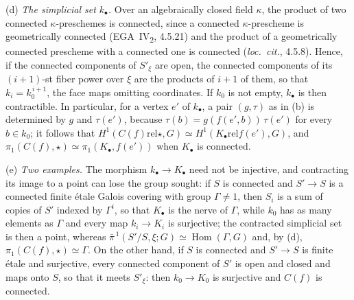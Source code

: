 \par\smallskip\noindent{}(d)
\emph{The simplicial set \(k_\bullet\).}
Over an algebraically closed field
\(\kappa\), the product of two connected \(\kappa\)-preschemes is
connected, since a connected \(\kappa\)-prescheme is geometrically
connected (EGA~IV\textsubscript{2}, 4.5.21) and the product of a
geometrically connected prescheme with a connected one is connected
(\emph{loc.\ cit.}, 4.5.8). Hence, if the connected components of
\(S'_\xi\) are open, the connected components of its \((i+1)\)-st fiber
power over \(\xi\) are the products of \(i+1\) of them, so that
\(k_i=k_0^{\,i+1}\), the face maps omitting coordinates. If \(k_0\) is
not empty, \(k_\bullet\) is then contractible. In particular, for a vertex
\(e'\) of \(k_\bullet\), a pair \((g,\tau)\) as in (b) is determined by
\(g\) and \(\tau(e')\), because \(\tau(b)=g(f(e',b))\,\tau(e')\) for every
\(b\in k_0\); it follows that
\(H^1(C(f)\mathbin{\mathrm{rel}}\star,G)\simeq
H^1(K_\bullet\mathbin{\mathrm{rel}}f(e'),G)\), and
\(\pi_1(C(f),\star)\simeq\pi_1(K_\bullet,f(e'))\) when \(K_\bullet\) is
connected.

\par\smallskip\noindent{}(e)
\emph{Two examples.} The morphism \(k_\bullet\to K_\bullet\) need not be
injective, and contracting its image to a point can lose the group
sought: if \(S\) is connected and \(S'\to S\) is a connected finite étale
Galois covering with group \(\Gamma\neq1\), then \(S_i\) is a sum of copies
of \(S'\) indexed by \(\Gamma^i\), so that \(K_\bullet\) is the nerve of
\(\Gamma\), while \(k_0\) has as many elements as \(\Gamma\) and every map
\(k_i\to K_i\) is surjective; the contracted simplicial set is then a
point, whereas \(\bar\pi^{\,1}(S'/S,\xi;G)\simeq\operatorname{Hom}(\Gamma,G)\)
and, by (d), \(\pi_1(C(f),\star)\simeq\Gamma\). On the other hand, if
\(S\) is connected and \(S'\to S\) is finite étale and surjective, every
connected component of \(S'\) is open and closed and maps onto \(S\), so
that it meets \(S'_\xi\): then \(k_0\to K_0\) is surjective and \(C(f)\)
is connected.
